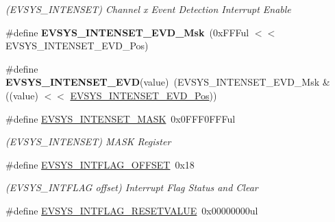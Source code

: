 \begin{DoxyCompactItemize}
\begin{DoxyCompactList}\small\item\em (E\+V\+S\+Y\+S\+\_\+\+I\+N\+T\+E\+N\+S\+E\+T) Channel x Event Detection Interrupt Enable \end{DoxyCompactList}\item 
\hypertarget{group___s_a_m_l21___e_v_s_y_s_gae62892a13725d99783475ce3b4bfb043}{}\#define {\bfseries E\+V\+S\+Y\+S\+\_\+\+I\+N\+T\+E\+N\+S\+E\+T\+\_\+\+E\+V\+D\+\_\+\+Msk}~(0x\+F\+F\+Ful $<$$<$ E\+V\+S\+Y\+S\+\_\+\+I\+N\+T\+E\+N\+S\+E\+T\+\_\+\+E\+V\+D\+\_\+\+Pos)\label{group___s_a_m_l21___e_v_s_y_s_gae62892a13725d99783475ce3b4bfb043}

\item 
\hypertarget{group___s_a_m_l21___e_v_s_y_s_ga0830117798f7624f0e050988614b0bf9}{}\#define {\bfseries E\+V\+S\+Y\+S\+\_\+\+I\+N\+T\+E\+N\+S\+E\+T\+\_\+\+E\+V\+D}(value)~(E\+V\+S\+Y\+S\+\_\+\+I\+N\+T\+E\+N\+S\+E\+T\+\_\+\+E\+V\+D\+\_\+\+Msk \& ((value) $<$$<$ \hyperlink{group___s_a_m_l21___e_v_s_y_s_ga0b9e0e6564aadc19f81955941877a3a7}{E\+V\+S\+Y\+S\+\_\+\+I\+N\+T\+E\+N\+S\+E\+T\+\_\+\+E\+V\+D\+\_\+\+Pos}))\label{group___s_a_m_l21___e_v_s_y_s_ga0830117798f7624f0e050988614b0bf9}

\item 
\hypertarget{group___s_a_m_l21___e_v_s_y_s_ga3703385b0ca9ffba38ace09ea09cca2c}{}\#define \hyperlink{group___s_a_m_l21___e_v_s_y_s_ga3703385b0ca9ffba38ace09ea09cca2c}{E\+V\+S\+Y\+S\+\_\+\+I\+N\+T\+E\+N\+S\+E\+T\+\_\+\+M\+A\+S\+K}~0x0\+F\+F\+F0\+F\+F\+Ful\label{group___s_a_m_l21___e_v_s_y_s_ga3703385b0ca9ffba38ace09ea09cca2c}

\begin{DoxyCompactList}\small\item\em (E\+V\+S\+Y\+S\+\_\+\+I\+N\+T\+E\+N\+S\+E\+T) M\+A\+S\+K Register \end{DoxyCompactList}\item 
\hypertarget{group___s_a_m_l21___e_v_s_y_s_gab538bb1832d35f863db2f03f217e7446}{}\#define \hyperlink{group___s_a_m_l21___e_v_s_y_s_gab538bb1832d35f863db2f03f217e7446}{E\+V\+S\+Y\+S\+\_\+\+I\+N\+T\+F\+L\+A\+G\+\_\+\+O\+F\+F\+S\+E\+T}~0x18\label{group___s_a_m_l21___e_v_s_y_s_gab538bb1832d35f863db2f03f217e7446}

\begin{DoxyCompactList}\small\item\em (E\+V\+S\+Y\+S\+\_\+\+I\+N\+T\+F\+L\+A\+G offset) Interrupt Flag Status and Clear \end{DoxyCompactList}\item 
\hypertarget{group___s_a_m_l21___e_v_s_y_s_ga998535a4c267df3a8bf7abbc2749fc8b}{}\#define \hyperlink{group___s_a_m_l21___e_v_s_y_s_ga998535a4c267df3a8bf7abbc2749fc8b}{E\+V\+S\+Y\+S\+\_\+\+I\+N\+T\+F\+L\+A\+G\+\_\+\+R\+E\+S\+E\+T\+V\+A\+L\+U\+E}~0x00000000ul\label{group___s_a_m_l21___e_v_s_y_s_ga998535a4c267df3a8bf7abbc2749fc8b}


\end{DoxyCompactItemize}
